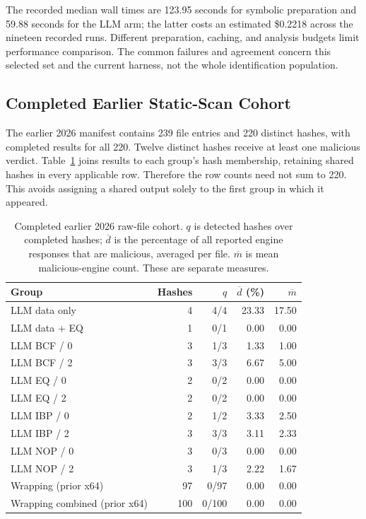 The recorded median wall times are 123.95 seconds for symbolic
preparation and 59.88 seconds for the LLM arm; the latter costs an
estimated \$0.2218 across the nineteen recorded runs. Different
preparation, caching, and analysis budgets limit performance comparison.
The common failures and agreement concern this selected set and the
current harness, not the whole identification population.

\subsection{Completed Earlier Static-Scan Cohort}
The earlier 2026 manifest contains 239 file entries and 220 distinct
hashes, with completed results for all 220. Twelve distinct hashes
receive at least one malicious verdict. Table~\ref{tab:new_vt_cohort}
joins results to each group's hash membership, retaining shared hashes
in every applicable row. Therefore the row counts need not sum to 220.
This avoids assigning a shared output solely to the first group in
which it appeared.

\begin{table}[t]
\caption{Completed earlier 2026 raw-file cohort. $q$ is detected hashes
over completed hashes; $\overline d$ is the percentage of all reported
engine responses that are malicious, averaged per file. $\overline m$
is mean malicious-engine count. These are separate measures.}
\label{tab:new_vt_cohort}
\centering\small\setlength{\tabcolsep}{4pt}
\begin{tabular}{@{}lrrrr@{}}
\toprule
Group & Hashes & $q$ & $\overline d$ (\%) & $\overline m$ \\
\midrule
LLM data only & 4 & 4/4 & 23.33 & 17.50 \\
LLM data + EQ & 1 & 0/1 & 0.00 & 0.00 \\
LLM BCF / 0 & 3 & 1/3 & 1.33 & 1.00 \\
LLM BCF / 2 & 3 & 3/3 & 6.67 & 5.00 \\
LLM EQ / 0 & 2 & 0/2 & 0.00 & 0.00 \\
LLM EQ / 2 & 2 & 0/2 & 0.00 & 0.00 \\
LLM IBP / 0 & 2 & 1/2 & 3.33 & 2.50 \\
LLM IBP / 2 & 3 & 3/3 & 3.11 & 2.33 \\
LLM NOP / 0 & 3 & 0/3 & 0.00 & 0.00 \\
LLM NOP / 2 & 3 & 1/3 & 2.22 & 1.67 \\
Wrapping (prior x64) & 97 & 0/97 & 0.00 & 0.00 \\
Wrapping combined (prior x64) & 100 & 0/100 & 0.00 & 0.00 \\
\bottomrule
\end{tabular}
\end{table}

